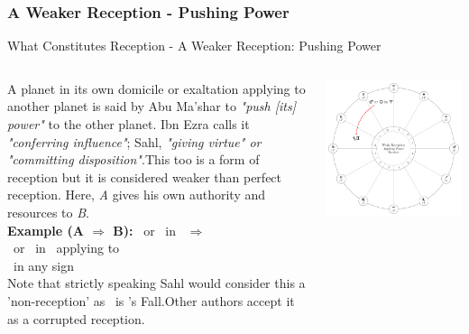\subsubsection{A Weaker Reception - Pushing Power}
\begin{frame}[t]{What Constitutes Reception - A Weaker Reception: Pushing Power}
\begin{columns}[T, onlytextwidth]
A planet in its own domicile or exaltation applying to another planet is said by Abu Ma'shar to \textsl{"push [its] power"} to the other planet. Ibn Ezra calls it \textsl{"conferring influence"}; Sahl, \textsl{"giving virtue" or "committing disposition"}.\footnotemark[1]This too is a form of reception but it is considered weaker than perfect reception. Here, \textsl{A} gives his own authority and resources to \textsl{B}. \\
\vspace{0.2cm}
\textbf{Example (A $\Rightarrow$ B):} \Mars\ or \Sun\ in \Aries\ $\Rightarrow$  \Saturn \\
\ul
\vspace{0.2cm}
\Mars\ or \Sun\ in \Aries\ applying to  \\
\Saturn\ in any sign \\
\vspace{0.25cm}
Note that strictly speaking Sahl would consider this a 'non-reception' as \Aries\ is \Saturn's Fall.\footnotemark[2] Other authors accept it as a corrupted reception.

\begin{center}
{\includegraphics[width=\textwidth]{charts/01-weaker-reception}} \\
\end{center}

\end{columns}
\vspace{0.2cm}
\end{frame}
